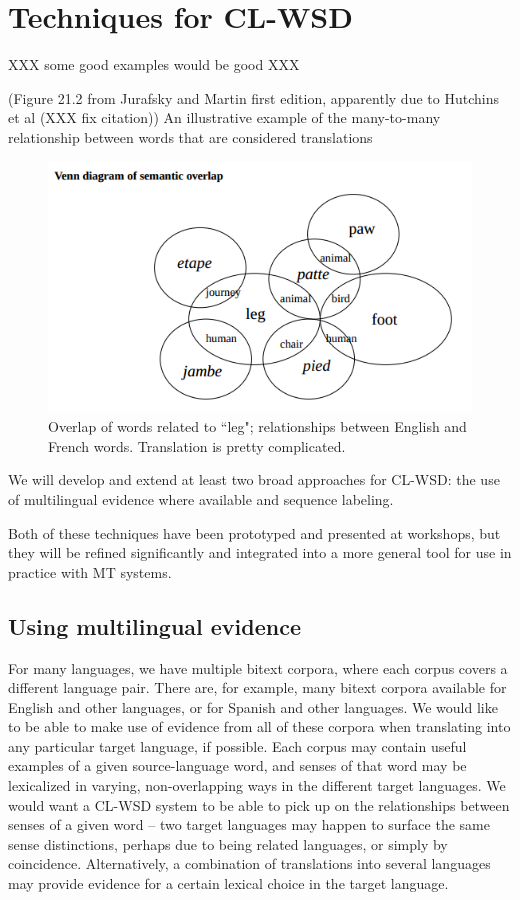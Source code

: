 \section{Techniques for CL-WSD}

XXX some good examples would be good XXX

(Figure 21.2 from Jurafsky and Martin first edition, apparently due to Hutchins
et al (XXX fix citation))
An illustrative example of the many-to-many relationship between words that are
considered translations
\cite[chap 21]{slp1}


\begin{figure}
  \includegraphics[width=12cm]{hutchins-leg-etc.png}
  \caption{Overlap of words related to ``leg"; relationships between English
  and French words. Translation is pretty complicated.}
  \label{fig:leg}
\end{figure}


We will develop and extend at least two broad approaches for CL-WSD: the use
of multilingual evidence where available and sequence labeling.

Both of these techniques have been prototyped and presented at workshops, but
they will be refined significantly and integrated into a more general tool for
use in practice with MT systems.

\subsection{Using multilingual evidence}
For many languages, we have multiple bitext corpora, where each corpus covers a
different language pair. There are, for example, many bitext corpora available
for English and other languages, or for Spanish and other languages.
We would like to be able to make use of evidence from all of these corpora when
translating into any particular target language, if possible.
Each corpus may contain useful examples of a given source-language word,
and senses of that word may be lexicalized in varying, non-overlapping ways in
the different target languages.
We would want a CL-WSD system to be able to pick up on the relationships
between senses of a given word -- two target languages may happen to surface
the same sense distinctions, perhaps due to being related languages, or simply
by coincidence. Alternatively, a combination of translations into several
languages may provide evidence for a certain lexical choice in the target
language.

